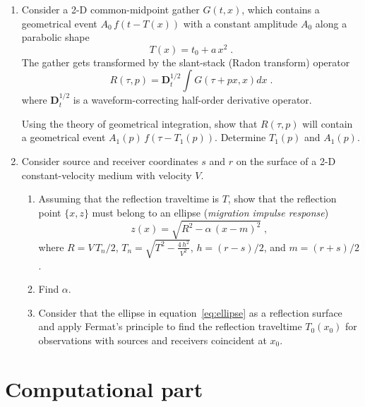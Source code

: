 \begin{enumerate}
\item Consider a 2-D common-midpoint gather $G(t,x)$, which
  contains a geometrical event $A_0\,f\left(t-T(x)\right)$ with a
  constant amplitude $A_0$ along a parabolic shape
\begin{equation}
\label{eq:hyper}
T(x) = t_0+a\,x^2\;.
\end{equation}
The gather gets transformed by the slant-stack (Radon transform) operator
\begin{equation}
\label{eq:radon}
R(\tau,p) = \mathbf{D}_t^{1/2} \int G(\tau + p x, x) d x\;.
\end{equation}
where $ \mathbf{D}_t^{1/2}$ is a waveform-correcting half-order
derivative operator.

Using the theory of geometrical integration, show that $R(\tau,p)$
will contain a geometrical event $A_1(p)\,f\left(\tau-T_1(p)\right)$.
Determine $T_1(p)$ and $A_1(p)$.

\newpage

\item Consider source and receiver coordinates $s$ and $r$ on the
  surface of a 2-D constant-velocity medium with velocity
  $V$. 

  \begin{enumerate}
  \item Assuming that the reflection traveltime is $T$, show that the
    reflection point $\{x,z\}$ must belong to an ellipse (\emph{migration
      impulse response})
    \begin{equation}
      \label{eq:ellipse}
      z(x) = \sqrt{R^2 - \alpha\,(x-m)^2}\;,
    \end{equation}
    where $R=V\,T_n/2$, $T_n=\sqrt{T^2-\frac{4\,h^2}{V^2}}$, $h=(r-s)/2$, and $m=(r+s)/2$.
  \item Find $\alpha$.
  \item Consider that the ellipse in equation~\ref{eq:ellipse} as a
    reflection surface and apply Fermat's principle to find the reflection
    traveltime $T_0(x_0)$ for observations with sources and receivers coincident at $x_0$.
  \end{enumerate}

\end{enumerate}

\section{Computational part}


